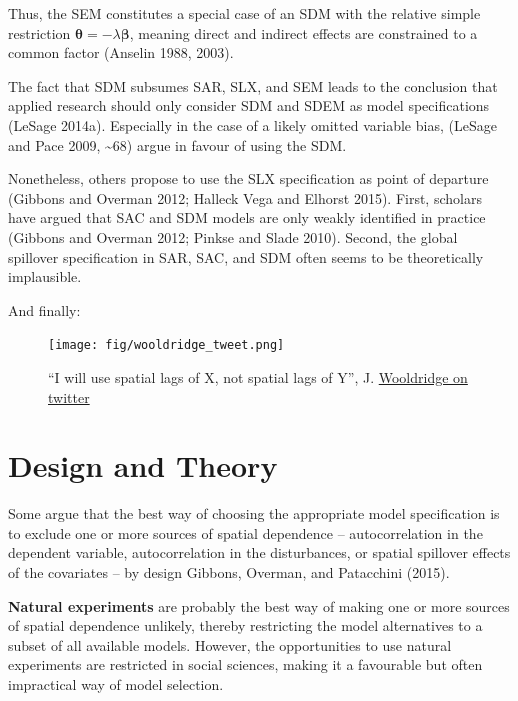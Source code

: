 \documentclass[
  letterpaper,
]{scrbook}
\begin{document}
Thus, the SEM constitutes a special case of an SDM with the relative
simple restriction
\({\boldsymbol{\mathbf{\theta}}}=-\lambda{\boldsymbol{\mathbf{\beta}}}\),
meaning direct and indirect effects are constrained to a common factor
(Anselin 1988, 2003).

The fact that SDM subsumes SAR, SLX, and SEM leads to the conclusion
that applied research should only consider SDM and SDEM as model
specifications (LeSage 2014a). Especially in the case of a likely
omitted variable bias, (LeSage and Pace 2009, \textasciitilde68) argue
in favour of using the SDM.

Nonetheless, others propose to use the SLX specification as point of
departure (Gibbons and Overman 2012; Halleck Vega and Elhorst 2015).
First, scholars have argued that SAC and SDM models are only weakly
identified in practice (Gibbons and Overman 2012; Pinkse and Slade
2010). Second, the global spillover specification in SAR, SAC, and SDM
often seems to be theoretically implausible.

And finally:

\begin{figure}

{\centering \texttt{[image: fig/wooldridge\_tweet.png]}

}

\caption{``I will use spatial lags of X, not spatial lags of Y'', J.
\href{https://twitter.com/jmwooldridge/status/1369460526770753537}{Wooldridge
on twitter}}

\end{figure}

\hypertarget{design-and-theory}{%
\section{Design and Theory}\label{design-and-theory}}

Some argue that the best way of choosing the appropriate model
specification is to exclude one or more sources of spatial dependence --
autocorrelation in the dependent variable, autocorrelation in the
disturbances, or spatial spillover effects of the covariates -- by
design Gibbons, Overman, and Patacchini (2015).

\textbf{Natural experiments} are probably the best way of making one or
more sources of spatial dependence unlikely, thereby restricting the
model alternatives to a subset of all available models. However, the
opportunities to use natural experiments are restricted in social
sciences, making it a favourable but often impractical way of model
selection.
\end{document}

